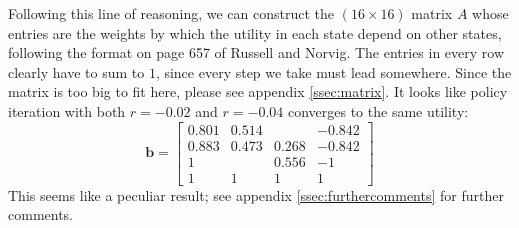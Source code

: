 \documentclass[letterpaper, 10pt]{article}
\begin{document}
\begin{multicols*}{2}
Following this line of reasoning, we can construct the $(16 \times 16)$ matrix $A$ whose entries are the weights by which the utility in each state depend on other states, following the format on page 657 of Russell and Norvig.
The entries in every row clearly have to sum to $1$, since every step we take must lead somewhere. 
Since the matrix is too big to fit here, please see appendix \ref{ssec:matrix}. 
It looks like policy iteration with both $r = -0.02$ and $r = -0.04$ converges to the same utility:
\[
\mathbf{b} = 
\begin{bmatrix}
	0.801 & 0.514 &       & -0.842 \\
	0.883 & 0.473 & 0.268 & -0.842 \\
	1     &       & 0.556 & -1     \\
	1     & 1     & 1     &  1
\end{bmatrix}
\]
This seems like a peculiar result; see appendix \ref{ssec:furthercomments} for further comments.

% 


\end{multicols*}
\end{document}
